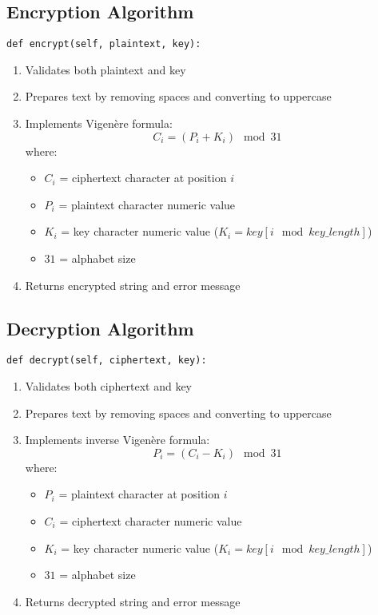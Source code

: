 \documentclass[12pt]{article}
\begin{document}
\subsection*{Encryption Algorithm}
\begin{verbatim}
def encrypt(self, plaintext, key):
\end{verbatim}
\begin{enumerate}
    \item Validates both plaintext and key
    \item Prepares text by removing spaces and converting to uppercase
    \item Implements Vigenère formula: 
    \[
    C_i = (P_i + K_i) \mod 31
    \]
    where:
    \begin{itemize}
        \item $C_i$ = ciphertext character at position $i$
        \item $P_i$ = plaintext character numeric value
        \item $K_i$ = key character numeric value ($K_i = key[i \mod key\_length]$)
        \item $31$ = alphabet size
    \end{itemize}
    \item Returns encrypted string and error message
\end{enumerate}

\subsection*{Decryption Algorithm}
\begin{verbatim}
def decrypt(self, ciphertext, key):
\end{verbatim}
\begin{enumerate}
    \item Validates both ciphertext and key
    \item Prepares text by removing spaces and converting to uppercase
    \item Implements inverse Vigenère formula:
    \[
    P_i = (C_i - K_i) \mod 31
    \]
    where:
    \begin{itemize}
        \item $P_i$ = plaintext character at position $i$
        \item $C_i$ = ciphertext character numeric value
        \item $K_i$ = key character numeric value ($K_i = key[i \mod key\_length]$)
        \item $31$ = alphabet size
    \end{itemize}
    \item Returns decrypted string and error message
\end{enumerate}
\end{document}
